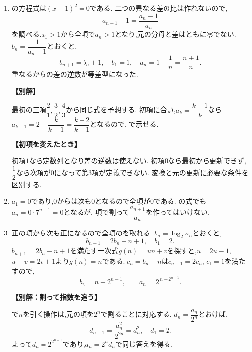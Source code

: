 \begin{enumerate}[label=\textbf{問\arabic*.},leftmargin=3.8em,format=\bookitemlink{practice-basic}{solution}{problem}]
          \item {}の方程式は$(x-1)^2=0$である.
                  二つの異なる差の比は作れないので,
                  \[
                    a_{n+1}-1=\frac{a_n-1}{a_n}
                  \]
                  を調べる.$a_1>1$から全項で$a_n>1$となり,元の分母と差はともに零でない.
                  $b_n=\dfrac{1}{a_n-1}$とおくと,
                  \[
                    b_{n+1}=b_n+1,\quad b_1=1,
                    \quad a_n=1+\frac1n=\frac{n+1}n.
                  \]
                  重なるからの差の逆数が等差型になった.
                  \par\smallskip\noindent\textbf{【別解】}\par
                  最初の三項$\dfrac{2}{1},\dfrac{3}{2},\dfrac{4}{3}$から同じ式を予想する.
                  初項に合い,$a_k=\dfrac{k+1}{k}$なら$a_{k+1}=2-\dfrac{k}{k+1}=\dfrac{k+2}{k+1}$となるので,
                  で示せる.
                  \par\smallskip\noindent\textbf{【初項を変えたとき】}\par\nopagebreak[4]
                  初項$1$なら定数列となり差の逆数は使えない.
                  初項$0$なら最初から更新できず,$\dfrac{1}{2}$なら次項が$0$になって第3項が定義できない.
                  変換と元の更新に必要な条件を区別する.

          \item $a_1=0$であり,$0$からは次も$0$となるので全項が$0$である.
                  の式でも$a_n=0\cdot7^{n-1}=0$となるが,
                  項で割って$\dfrac{a_{n+1}}{a_n}$を作ってはいけない.

          \item 正の項から次も正になるので全項のを取れる.
                  $b_n=\log_2a_n$とおくと,
                  \[
                    b_{n+1}=2b_n-n+1,\quad b_1=2.
                  \]
                  $b_{n+1}=2b_n-n+1$を満たす一次式$g(n)=un+v$を探すと,$u=2u-1$, $u+v=2v+1$より$g(n)=n$である.
                  $c_n=b_n-n$は$c_{n+1}=2c_n$, $c_1=1$を満たすので,
                  \[
                    b_n=n+2^{n-1},\qquad a_n=2^{\,n+2^{n-1}}.
                  \]
                  \par\smallskip\noindent\textbf{【別解：割って指数を追う】}\par
                  で$n$を引く操作は,元の項を$2^n$で割ることに対応する.
                  $d_n=\dfrac{a_n}{2^n}$とおけば,
                  \[
                    d_{n+1}=\frac{a_n^2}{2^{2n}}=d_n^2,\quad d_1=2.
                  \]
                  よって$d_n=2^{2^{n-1}}$であり,$a_n=2^nd_n$で同じ答えを得る.


\end{enumerate}
